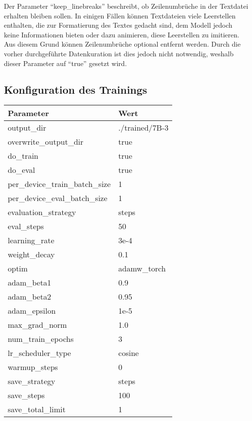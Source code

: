 Der Parameter \enquote{keep\_linebreaks} beschreibt, ob Zeilenumbrüche in der Textdatei erhalten bleiben sollen.
In einigen Fällen können Textdateien viele Leerstellen enthalten, die zur Formatierung des Textes gedacht sind, dem Modell jedoch keine Informationen bieten oder dazu animieren, diese Leerstellen zu imitieren.
Aus diesem Grund können Zeilenumbrüche optional entfernt werden.
Durch die vorher durchgeführte Datenkuration ist dies jedoch nicht notwendig, weshalb dieser Parameter auf \enquote{true} gesetzt wird.\\

\subsection{Konfiguration des Trainings}\label{subsec:config-training}
\begin{table}
    \centering
    \begin{tabular}{ll}
        \toprule
        \textbf{Parameter} & \textbf{Wert} \\
        \midrule
        output\_dir & ./trained/7B-3 \\
        overwrite\_output\_dir & true \\
        do\_train & true \\
        do\_eval & true \\
        per\_device\_train\_batch\_size & 1 \\
        per\_device\_eval\_batch\_size & 1 \\
        evaluation\_strategy & steps \\
        eval\_steps & 50 \\
        learning\_rate & 3e-4 \\
        weight\_decay & 0.1 \\
        optim & adamw\_torch \\
        adam\_beta1 & 0.9 \\
        adam\_beta2 & 0.95 \\
        adam\_epsilon & 1e-5 \\
        max\_grad\_norm & 1.0 \\
        num\_train\_epochs & 3 \\
        lr\_scheduler\_type & cosine \\
        warmup\_steps & 0 \\
        save\_strategy & steps \\
        save\_steps & 100 \\
        save\_total\_limit & 1 \\

\end{tabular}
\end{table}
